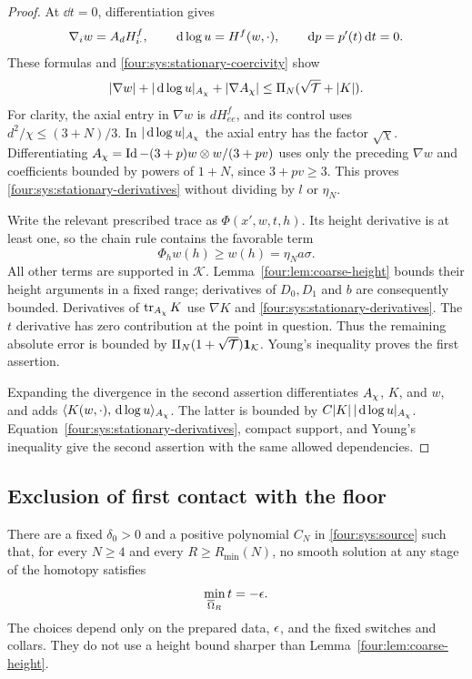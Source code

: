 \begin{proof}
At $\dd t=0$, differentiation gives
\[
 \nabla_iw=A_d H^f_{i\cdot},\qquad
 \,\mathrm d\log u=H^f(w,\cdot),\qquad \,\mathrm d p=p'(t)\,\mathrm d t=0.
\]
These formulas and \eqref{four:sys:stationary-coercivity} show
\begin{equation}\label{four:sys:stationary-derivatives}
 |\nabla w|+|\,\mathrm d\log u|_{A_\chi}+|\nabla A_\chi|
                  \le\Pi_N(\sqrt{\mathcal T}+|K|).
\end{equation}
For clarity, the axial entry in $\nabla w$ is $dH^f_{ee}$, and its
control uses $d^2/\chi\le(3+N)/3$.  In $|\,\mathrm d\log u|_{A_\chi}$
the axial entry has the factor $\sqrt\chi$.  Differentiating
$A_\chi=\operatorname{Id}-(3+p)w\otimes w/(3+pv)$ uses only the preceding
$\nabla w$ and coefficients bounded by powers of $1+N$, since
$3+pv\ge3$.  This proves \eqref{four:sys:stationary-derivatives} without
dividing by $l$ or $\eta_N$.

Write the relevant prescribed trace as $\Phi(x',w,t,h)$.  Its height
derivative is at least one, so the chain rule contains the favorable term
\[
 \Phi_h w(h)\ge w(h)=\eta_N a\sigma.
\]
All other terms are supported in $\mathcal K$.  Lemma~\ref{four:lem:coarse-height}
bounds their height arguments in a fixed range; derivatives of $D_0,D_1$
and $b$ are consequently bounded.  Derivatives of $\operatorname{tr}_{A_\chi}K$ use
$\nabla K$ and \eqref{four:sys:stationary-derivatives}.  The $t$ derivative
has zero contribution at the point in question.  Thus the remaining
absolute error is bounded by $\Pi_N(1+\sqrt{\mathcal T})\mathbf1_{\mathcal K}$.
Young's inequality proves the first assertion.

Expanding the divergence in the second assertion differentiates
$A_\chi$, $K$, and $w$, and adds
$\langle K(w,\cdot),\,\mathrm d\log u\rangle_{A_\chi}$.
The latter is bounded by $C|K|\,|\,\mathrm d\log u|_{A_\chi}$.
Equation~\eqref{four:sys:stationary-derivatives}, compact support, and Young's
inequality give the second assertion with the same allowed dependencies.
\end{proof}

\subsection{Exclusion of first contact with the floor}

\begin{proposition}\label{four:prop:floor-exclusion}
There are a fixed $\delta_0>0$ and a positive polynomial $C_N$ in
\eqref{four:sys:source} such that, for every $N\ge4$ and every
$R\ge R_{\min}(N)$, no smooth solution at any stage of the homotopy
satisfies
\[
 \min_{\overline\Omega_R}t=-\epsilon.
\]
The choices depend only on the prepared data, $\epsilon$, and the fixed
switches and collars.  They do not use a height bound sharper than
Lemma~\ref{four:lem:coarse-height}.
\end{proposition}

